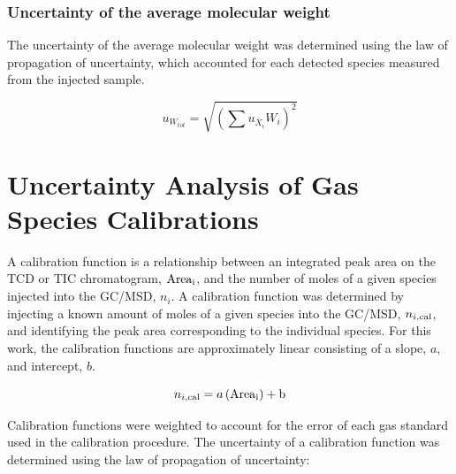 \documentclass[12pt]{article}
\begin{document}
\subsubsection{Uncertainty of the average molecular weight}
\label{ssec:Uncertainty of the average molecular weight}
The uncertainty of the average molecular weight was determined using the law of propagation of uncertainty, which accounted for each detected species measured from the injected sample.

\begin{equation}\label{eq:Uncertainty_Total_MW}
	u_{\scriptscriptstyle W_{tot}}=\sqrt{\left(\sum{{u_{\scriptscriptstyle \bar{X}_{i}}}{{W_{i}}}}\right)^2}
\end{equation}

\pagebreak

\section{Uncertainty Analysis of Gas Species Calibrations}\label{sec:Uncertainty Analysis of Gas Species Calibrations}
A calibration function is a relationship between an integrated peak area on the TCD or TIC chromatogram, $\rm{Area}_{i}$, and the number of moles of a given species injected into the GC/MSD, $n_{i}$. A calibration function was determined by injecting a known amount of moles of a given species into the GC/MSD, $n_{i,\rm cal}$, and identifying the peak area corresponding to the individual species. For this work, the calibration functions are approximately linear consisting of a slope, $a$, and intercept, $b$.

\begin{equation}
\label{eq:Calibration Curve}
n_{i,\rm cal} = a \, (\rm {Area}_{i})+b
\end{equation}

Calibration functions were weighted to account for the error of each gas standard used in the calibration procedure. The uncertainty of a calibration function was determined using the law of propagation of uncertainty:
\end{document}
